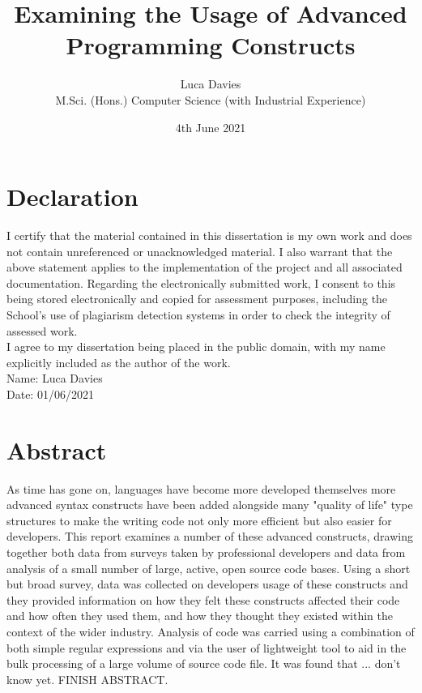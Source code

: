 \documentclass{article}
\title{\textbf{Examining the Usage of Advanced Programming Constructs}}
\author{
Luca Davies \\ M.Sci. (Hons.) Computer Science (with Industrial Experience)}
\date{4th June 2021}
\begin{document}
\maketitle

\newpage
\section*{Declaration}
    I certify that the material contained in this dissertation is my own work and does not contain unreferenced or unacknowledged material. I also warrant that the above statement applies to the implementation of the project and all associated documentation. Regarding the electronically submitted work, I consent to this being stored electronically and copied for assessment purposes, including the School’s use of plagiarism detection systems in order to check the integrity of assessed work. \\
    I agree to my dissertation being placed in the public domain, with my name explicitly included as the author of the work. \\
    
    \noindent
    Name: Luca Davies\\
    Date: 01/06/2021
\newpage
\section*{Abstract}
    As time has gone on, languages have become more developed themselves more advanced syntax constructs have been added alongside many "quality of life" type structures to make the writing code not only more efficient but also easier for developers. This report examines a number of these advanced constructs, drawing together both data from surveys taken by professional developers and data from analysis of a small number of large, active, open source code bases. Using a short but broad survey, data was collected on developers usage of these constructs and they provided information on how they felt these constructs affected their code and how often they used them, and how they thought they existed within the context of the wider industry. Analysis of code was carried using a combination of both simple regular expressions and via the user of lightweight tool to aid in the bulk processing of a large volume of source code file. It was found that ... don't know yet. FINISH ABSTRACT.
    \newline
\newpage
\tableofcontents
\newpage
\end{document}
